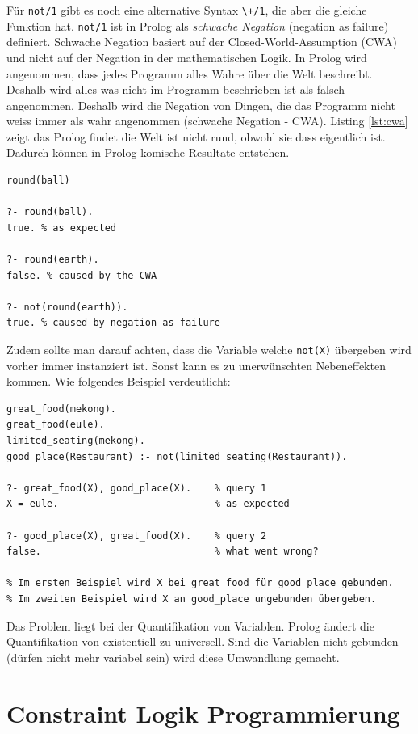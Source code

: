 Für \verb|not/1| gibt es noch eine alternative Syntax \verb|\+/1|, die aber die gleiche Funktion hat. \verb|not/1| ist in Prolog als \textit{schwache Negation} (negation as failure) definiert. Schwache Negation basiert auf der Closed-World-Assumption (CWA) und nicht auf der Negation in der mathematischen Logik. In Prolog wird angenommen, dass jedes Programm alles Wahre über die Welt beschreibt. Deshalb wird alles was nicht im Programm beschrieben ist als falsch angenommen. Deshalb wird die Negation von Dingen, die das Programm nicht weiss immer als wahr angenommen (schwache Negation - CWA). Listing \ref{lst:cwa} zeigt das Prolog findet die Welt ist nicht rund, obwohl sie dass eigentlich ist. Dadurch können in Prolog komische Resultate entstehen.

\begin{lstlisting}[caption=CWA, label=lst:cwa]
round(ball)

?- round(ball).
true. % as expected

?- round(earth).
false. % caused by the CWA

?- not(round(earth)).
true. % caused by negation as failure
\end{lstlisting}

Zudem sollte man darauf achten, dass die Variable welche \verb|not(X)| übergeben wird vorher immer instanziert ist. Sonst kann es zu unerwünschten Nebeneffekten kommen. Wie folgendes Beispiel verdeutlicht:

\begin{lstlisting}[caption=Not muss gebunden sein]
great_food(mekong).
great_food(eule).
limited_seating(mekong).
good_place(Restaurant) :- not(limited_seating(Restaurant)).
	
?- great_food(X), good_place(X). 	% query 1
X = eule. 							% as expected

?- good_place(X), great_food(X). 	% query 2
false. 								% what went wrong?

% Im ersten Beispiel wird X bei great_food für good_place gebunden.
% Im zweiten Beispiel wird X an good_place ungebunden übergeben.
\end{lstlisting}

Das Problem liegt bei der Quantifikation von Variablen. Prolog ändert die Quantifikation von existentiell zu universell. Sind die Variablen nicht gebunden (dürfen nicht mehr variabel sein) wird diese Umwandlung gemacht.

\section{Constraint Logik Programmierung}

